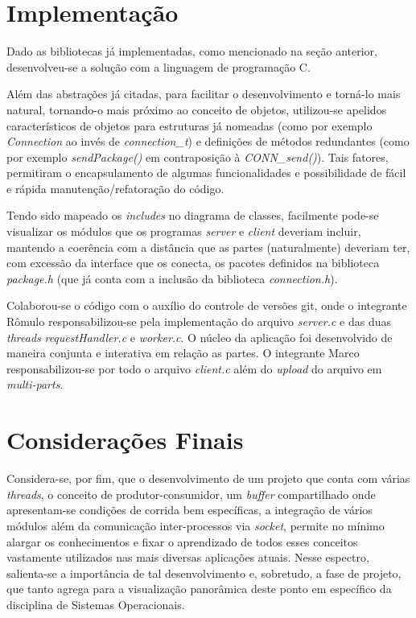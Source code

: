 \documentclass[12pt]{article}
\begin{document}
\section{Implementação}

Dado as bibliotecas já implementadas, como mencionado na seção anterior, desenvolveu-se a solução com a linguagem de programação C.

Além das abstrações já citadas, para facilitar o desenvolvimento e torná-lo mais natural, tornando-o mais próximo ao conceito de objetos, utilizou-se apelidos característicos de objetos para estruturas já nomeadas (como por exemplo \emph{Connection} ao invés de \emph{connection\_t}) e definições de métodos redundantes (como por exemplo \emph{sendPackage()} em contraposição à \emph{CONN\_send()}). Tais fatores, permitiram o encapsulamento de algumas funcionalidades e possibilidade de fácil e rápida manutenção/refatoração do código.

Tendo sido mapeado os \emph{includes} no diagrama de classes, facilmente pode-se visualizar os módulos que os programas \emph{server} e \emph{client} deveriam incluir, mantendo a coerência com a distância que as partes (naturalmente) deveriam ter, com excessão da interface que os conecta, os pacotes definidos na biblioteca \emph{package.h} (que já conta com a inclusão da biblioteca \emph{connection.h}).

Colaborou-se o código com o auxílio do controle de versões git, onde o integrante Rômulo responsabilizou-se pela implementação do arquivo \emph{server.c} e das duas \emph{threads} \emph{requestHandler.c} e \emph{worker.c}. O núcleo da aplicação foi desenvolvido de maneira conjunta e interativa em relação as partes. O integrante Marco responsabilizou-se por todo o arquivo \emph{client.c} além do \textit{upload} do arquivo em \textit{multi-parts}.

\section{Considerações Finais}

Considera-se, por fim, que o desenvolvimento de um projeto que conta com várias \textit{threads}, o conceito de produtor-consumidor, um \textit{buffer} compartilhado onde apresentam-se condições de corrida bem específicas, a integração de vários módulos além da comunicação inter-processos via \textit{socket}, permite no mínimo alargar os conhecimentos e fixar o aprendizado de todos esses conceitos vastamente utilizados nas mais diversas aplicações atuais. Nesse espectro, salienta-se a importância de tal desenvolvimento e, sobretudo, a fase de projeto, que tanto agrega para a visualização panorâmica deste ponto em específico da disciplina de Sistemas Operacionais.
\end{document}
